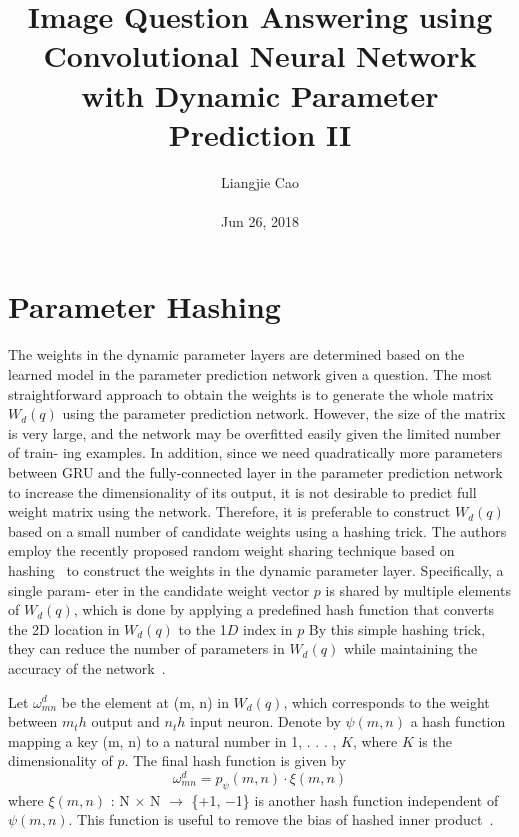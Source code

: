 \documentclass[10pt,twocolumn,letterpaper]{article}
\begin{document}
\title{\textbf{Image Question Answering using Convolutional Neural Network with Dynamic Parameter Prediction II
}}
\author{Liangjie Cao\\\\ Jun 26, 2018}
\maketitle
\section{Parameter Hashing}
The weights in the dynamic parameter layers are determined based on the learned model in the parameter prediction network given a question. The most straightforward
approach to obtain the weights is to generate the whole matrix $W_d(q)$ using the parameter prediction network. However, the size of the matrix is very large, and the network may be overfitted easily given the limited number of train-
ing examples. In addition, since we need quadratically more
parameters between GRU and the fully-connected layer in
the parameter prediction network to increase the dimensionality of its output, it is not desirable to predict full weight matrix using the network. Therefore, it is preferable to construct $W_d(q)$ based on a small number of candidate weights
using a hashing trick. The authors employ the recently proposed random weight sharing
technique based on hashing~\cite{name3} to construct the weights in
the dynamic parameter layer. Specifically, a single param-
eter in the candidate weight vector $p$ is shared by multiple
elements of $W_d(q)$, which is done by applying a predefined
hash function that converts the 2D location in $W_d(q)$ to the
1$D$ index in $p$ By this simple hashing trick, they can reduce the number of parameters in $W_d(q)$ while maintaining the
accuracy of the network~\cite{name3}.
\par Let $\omega_{mn}^d$ be the element at (m, n) in $W_d(q)$, which corresponds to the weight between $m_th$ output and $n_th$ input
neuron. Denote by $\psi(m, n)$ a hash function mapping a key
(m, n) to a natural number in {1, . . . , $K$}, where $K$ is the
dimensionality of $p$. The final hash function is given by
\begin{equation}
\omega_{mn}^d=p_\psi(m,n)\cdot\xi(m,n)
\end{equation}
where $\xi(m, n)$ : N × N $\to$ \{+1, −1\} is another hash function independent of $\psi(m, n)$. This function is useful to remove the bias of hashed inner product~\cite{name3}.	
\end{document}
